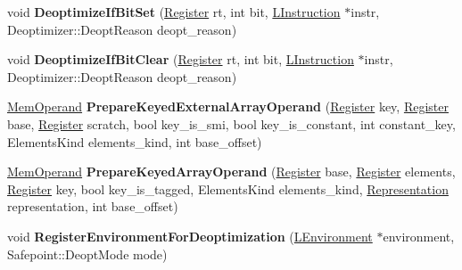 \begin{DoxyCompactItemize}
\item 
void {\bfseries Deoptimize\+If\+Bit\+Set} (\hyperlink{structv8_1_1internal_1_1_register}{Register} rt, int bit, \hyperlink{classv8_1_1internal_1_1_l_instruction}{L\+Instruction} $\ast$instr, Deoptimizer\+::\+Deopt\+Reason deopt\+\_\+reason)\hypertarget{classv8_1_1internal_1_1_l_code_gen_a2d827caed2fe7ce25de3310bf7055ecc}{}\label{classv8_1_1internal_1_1_l_code_gen_a2d827caed2fe7ce25de3310bf7055ecc}

\item 
void {\bfseries Deoptimize\+If\+Bit\+Clear} (\hyperlink{structv8_1_1internal_1_1_register}{Register} rt, int bit, \hyperlink{classv8_1_1internal_1_1_l_instruction}{L\+Instruction} $\ast$instr, Deoptimizer\+::\+Deopt\+Reason deopt\+\_\+reason)\hypertarget{classv8_1_1internal_1_1_l_code_gen_ac113d2a80d6c45ea62f7fb153998c146}{}\label{classv8_1_1internal_1_1_l_code_gen_ac113d2a80d6c45ea62f7fb153998c146}

\item 
\hyperlink{classv8_1_1internal_1_1_mem_operand}{Mem\+Operand} {\bfseries Prepare\+Keyed\+External\+Array\+Operand} (\hyperlink{structv8_1_1internal_1_1_register}{Register} key, \hyperlink{structv8_1_1internal_1_1_register}{Register} base, \hyperlink{structv8_1_1internal_1_1_register}{Register} scratch, bool key\+\_\+is\+\_\+smi, bool key\+\_\+is\+\_\+constant, int constant\+\_\+key, Elements\+Kind elements\+\_\+kind, int base\+\_\+offset)\hypertarget{classv8_1_1internal_1_1_l_code_gen_ad673e75b914978ece19fb9040d0d8f06}{}\label{classv8_1_1internal_1_1_l_code_gen_ad673e75b914978ece19fb9040d0d8f06}

\item 
\hyperlink{classv8_1_1internal_1_1_mem_operand}{Mem\+Operand} {\bfseries Prepare\+Keyed\+Array\+Operand} (\hyperlink{structv8_1_1internal_1_1_register}{Register} base, \hyperlink{structv8_1_1internal_1_1_register}{Register} elements, \hyperlink{structv8_1_1internal_1_1_register}{Register} key, bool key\+\_\+is\+\_\+tagged, Elements\+Kind elements\+\_\+kind, \hyperlink{classv8_1_1internal_1_1_representation}{Representation} representation, int base\+\_\+offset)\hypertarget{classv8_1_1internal_1_1_l_code_gen_a24c6ab14dfd763cca8cbb7f3e83ea196}{}\label{classv8_1_1internal_1_1_l_code_gen_a24c6ab14dfd763cca8cbb7f3e83ea196}

\item 
void {\bfseries Register\+Environment\+For\+Deoptimization} (\hyperlink{classv8_1_1internal_1_1_l_environment}{L\+Environment} $\ast$environment, Safepoint\+::\+Deopt\+Mode mode)\hypertarget{classv8_1_1internal_1_1_l_code_gen_a8e3566b9bf7194223c47e7dac6fd6a10}{}\label{classv8_1_1internal_1_1_l_code_gen_a8e3566b9bf7194223c47e7dac6fd6a10}


\end{DoxyCompactItemize}
